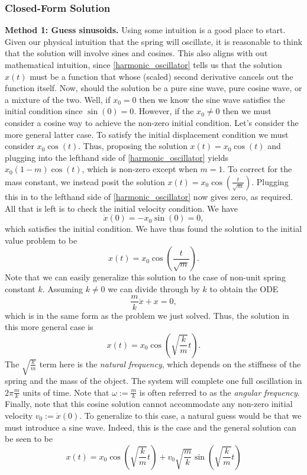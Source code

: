 \documentclass[12pt]{article}
\newcommand{\state}{x}
\begin{document}
\subsubsection{Closed-Form Solution}

\textbf{Method 1: Guess sinusoids.} Using some intuition is a good place to start. Given our physical intuition that the spring will oscillate, it is reasonable to think that the solution
will involve sines and cosines. This also aligns with out mathematical intuition, since \ref{harmonic_oscillator} tells us that the solution $\state(t)$ must be a function that 
whose (scaled) second derivative cancels out the function itself. Now, should the solution be a pure sine wave, pure cosine wave, or a mixture of the two. Well, if 
$\state_0 = 0$ then we know the sine wave satisfies the initial condition since $\sin(0) = 0$. However, if the $\state_0 \neq 0$ then we must consider a cosine way to 
achieve the non-zero initial condition.
 Let's consider the more general latter case. To satisfy the initial displacement condition we must consider $\state_0 \cos(t)$.
 Thus, proposing the solution $\state(t) = \state_0 \cos(t)$ and plugging into the lefthand side of 
\ref{harmonic_oscillator} yields $\state_0 (1 - m)\cos(t)$, which is non-zero except when $m = 1$. To correct for the mass constant, we instead posit the solution 
$\state(t) = \state_0 \cos\left(\frac{t}{\sqrt{m}}\right)$. Plugging this in to the lefthand side of \ref{harmonic_oscillator} now gives zero, as required. All that is left is to 
check the initial velocity condition. We have 
\[
\dot{\state}(0) = - \state_0 \sin\left(0\right) = 0, 
\]
which satisfies the initial condition. We have thus found the solution to the initial value problem to be
\[
\state(t) = \state_0 \cos\left(\frac{t}{\sqrt{m}}\right).
\]
Note that we can easily generalize this solution to the case of non-unit spring constant $k$. Assuming $k \neq 0$ we can divide through by $k$ to obtain the ODE
\[
\frac{m}{k} \ddot{x} + \state = 0,
\]
which is in the same form as the problem we just solved. Thus, the solution in this more general case is 
\[
\state(t) = \state_0 \cos\left(\sqrt{\frac{k}{m}} t \right).
\]
The $\sqrt{\frac{k}{m}}$ term here is the \textit{natural frequency}, which depends on the stiffness of the spring and the mass of the object. The system will 
complete one full oscillation in $2\pi \frac{m}{k}$ units of time. Note that $\omega := \frac{m}{k}$ is often referred to as the \textit{angular frequency}. 
Finally, note that this cosine solution cannot accommodate any non-zero initial velocity $v_0 := \dot{\state}(0)$. To generalize to this case, a natural guess would 
be that we must introduce a sine wave. Indeed, this is the case and the general solution can be seen to be
\[
\state(t) = \state_0 \cos\left(\sqrt{\frac{k}{m}} t \right) + v_0  \sqrt{\frac{m}{k}} \sin\left(\sqrt{\frac{k}{m}} t  \right)
\]
\end{document}
